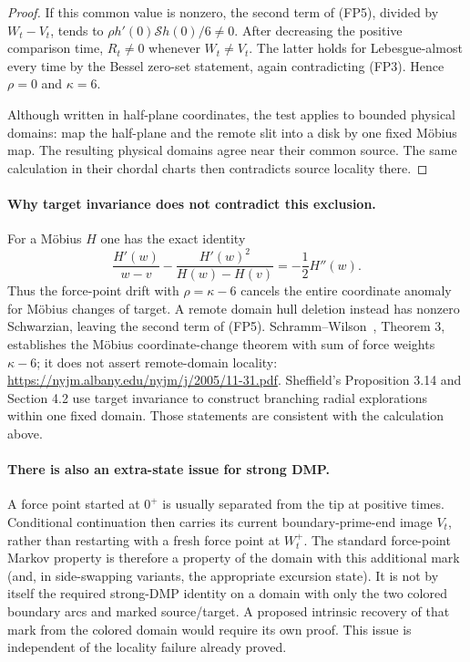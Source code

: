 \documentclass[11pt]{article}
\theoremstyle{definition}\newtheorem{definition}[theorem]{Definition}
\theoremstyle{remark}\newtheorem{remark}[theorem]{Remark}
\begin{document}
\begin{proof}
If this common value is nonzero, the second term of (FP5), divided by
$W_t-V_t$, tends to
$\rho h'(0)\mathcal S h(0)/6\ne0$. After decreasing the positive
comparison time, $R_t\ne0$ whenever $W_t\ne V_t$. The latter holds
for Lebesgue-almost every time by the Bessel zero-set statement, again
contradicting (FP3). Hence $\rho=0$ and $\kappa=6$.

Although written in half-plane coordinates, the test applies to bounded
physical domains: map the half-plane and the remote slit into a disk by
one fixed M\"obius map. The resulting physical domains agree near their
common source. The same calculation in their chordal charts then
contradicts source locality there.
\end{proof}

\paragraph{Why target invariance does not contradict this exclusion.}
For a M\"obius $H$ one has the exact identity
\[
 \frac{H'(w)}{w-v}
 -\frac{H'(w)^2}{H(w)-H(v)}=-\frac12H''(w).
 \tag{FP7}
\]
Thus the force-point drift with $\rho=\kappa-6$ cancels the entire
coordinate anomaly for M\"obius changes of target. A remote domain
hull deletion instead has nonzero Schwarzian, leaving the second term
of (FP5). Schramm--Wilson~\cite{schramm-wilson}, Theorem 3, establishes the M\"obius coordinate-change theorem with sum
of force weights $\kappa-6$; it does not assert remote-domain locality:
\url{https://nyjm.albany.edu/nyjm/j/2005/11-31.pdf}.
Sheffield's Proposition 3.14 and Section 4.2 use target invariance to
construct branching radial explorations within one fixed domain.
Those statements are consistent with the calculation above.

\paragraph{There is also an extra-state issue for strong DMP.}
A force point started at $0^+$ is usually separated from the tip at
positive times. Conditional continuation then carries its current
boundary-prime-end image $V_t$, rather than restarting with a fresh
force point at $W_t^+$. The standard force-point Markov property is
therefore a property of the domain with this additional mark (and,
in side-swapping variants, the appropriate excursion state). It is not
by itself the required strong-DMP identity on a domain with only the
two colored boundary arcs and marked source/target. A proposed intrinsic
recovery of that mark from the colored domain would require its own
proof. This issue is independent of the locality failure already proved.
\end{document}
